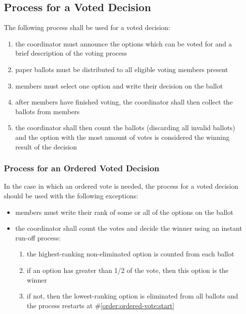 \documentclass[english,11pt]{article}
\begin{document}
\subsection{Process for a Voted Decision} \label{sect:decision:voted}
The following process shall be used for a voted decision:

\begin{enumerate}
    \item the coordinator must announce the options which can be voted for and a brief description of the voting process
    \item paper ballots must be distributed to all eligible voting members present
    \item members must select one option and write their decision on the ballot
    \item after members have finished voting, the coordinator shall then collect the ballots from members
    \item the coordinator shall then count the ballots (discarding all invalid ballots) and the option with the most amount of votes is considered the winning result of the decision
\end{enumerate}

\subsubsection{Process for an Ordered Voted Decision} \label{subsect:decision:voted:ordered}
In the case in which an ordered vote is needed, the process for a voted decision should be used with the following exceptions:

\begin{itemize}
    \item members must write their rank of some or all of the options on the ballot
    \item the coordinator shall count the votes and decide the winner using an instant run-off process:
    \begin{enumerate}
        \item \label{order:ordered-vote:start} the highest-ranking non-eliminated option is counted from each ballot
        \item if an option has greater than 1/2 of the vote, then this option is the winner
        \item if not, then the lowest-ranking option is eliminated from all ballots and the process restarts at \#\ref{order:ordered-vote:start}
    \end{enumerate}
\end{itemize}
\end{document}
